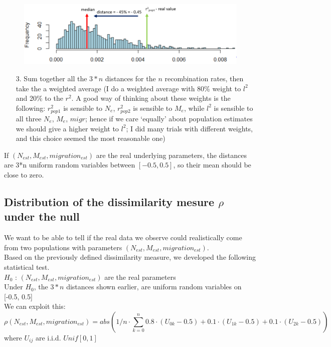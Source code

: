 \documentclass[a4paper,12pt]{article}
\begin{document}
{\begin{figure}[H]    
    \includegraphics[scale=0.6]{15.png}%
\end{figure}%

\begin{enumerate}
  \item[3.] Sum together all the $3*n$ distances for the $n$ recombination rates, then take the a weighted average (I do a weighted average with 80\% weight to $l^2$ and 20\% to the $r^2$. A good way of thinking about these weights is the following: $r^2_{pop1}$ is sensible to $N_e$,  $r^2_{pop2}$ is sensible to $M_e$, while $l^2$ is sensible to all three $N_e$, $M_e$, $migr$; hence if we care `equally' about population estimates we should give a higher weight to $l^2$; I did many trials with different weights, and this choice seemed the most reasonable one)
\end{enumerate}

If $(N_{est}, M_{est}, migration_{est})$ are the real underlying parameters, the distances are 3*n uniform random variables between $[-0.5, 0.5]$, so their mean should be close to zero.

\subsection{Distribution of the dissimilarity mesure \textbf{$\rho$} under the null}
We want to be able to tell if the real data we observe could realistically come from two populations with parameters $(N_{est}, M_{est}, migration_{est})$. \\
\noindent Based on the previously defined dissimilarity measure, we developed the following statistical test.\\

\noindent $H_0$ : $(N_{est}, M_{est}, migration_{est})$ are the real parameters\\
\noindent Under $H_0$,  the $3*n$ distances shown earlier, are uniform random variables on [-0.5, 0.5]\\
\noindent We can exploit this:
$$\rho(N_{est}, M_{est}, migration_{est}) = abs( 1/n \cdot \sum_{k= 0}^{n} 0.8\cdot (U_{0k} - 0.5)
+ 0.1 \cdot (U_{1k} - 0.5) + 0.1 \cdot(U_{2k} - 0.5))$$
where $U_{ij}$ are i.i.d. $Unif[0,1]$\\

}
\end{document}
